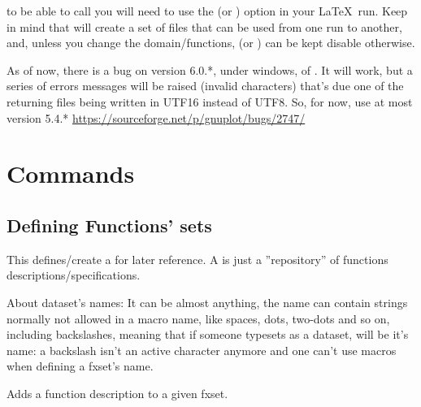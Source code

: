 \documentclass[10pt]{article}
\begin{document}
\begin{tsremark}
to be able to call  you will need to use the  (or ) option in your \LaTeX\  run. Keep in mind that  will create a set of files that can be used from one run to another, and, unless you change the domain/functions,  (or ) can be kept disable otherwise.
\end{tsremark}

\begin{tsremark}
As of now, there is a bug on version 6.0.*, under windows, of . It will work, but a series of errors messages will be raised (invalid characters) that's due one of the returning files being written in UTF16 instead of UTF8.
So, for now, use at most version 5.4.*
\url{https://sourceforge.net/p/gnuplot/bugs/2747/}
\end{tsremark}


\section{Commands}

\subsection{Defining Functions' sets}\label{function-set}

\begin{codedescribe}{\fxsetnew}
\begin{codesyntax}%
\end{codesyntax}
This defines/create a  for later reference. A  is just a ''repository'' of functions descriptions/specifications.
\end{codedescribe}

\begin{tsremark}
About dataset's names: It can be almost anything, the name can contain strings normally not allowed in a macro name, like spaces, dots, two-dots and so on, including backslashes, meaning that if someone typesets \tsobj{\XYZ} as a dataset, \tsobj{\XYZ} will be it's name: a backslash isn't an active character anymore and one can't use macros when defining a fxset's name.
\end{tsremark}


\begin{codedescribe}{\fxsetappend}
\begin{codesyntax}%
\end{codesyntax}
Adds a function description to a given fxset.
\end{codedescribe}
\end{document}
